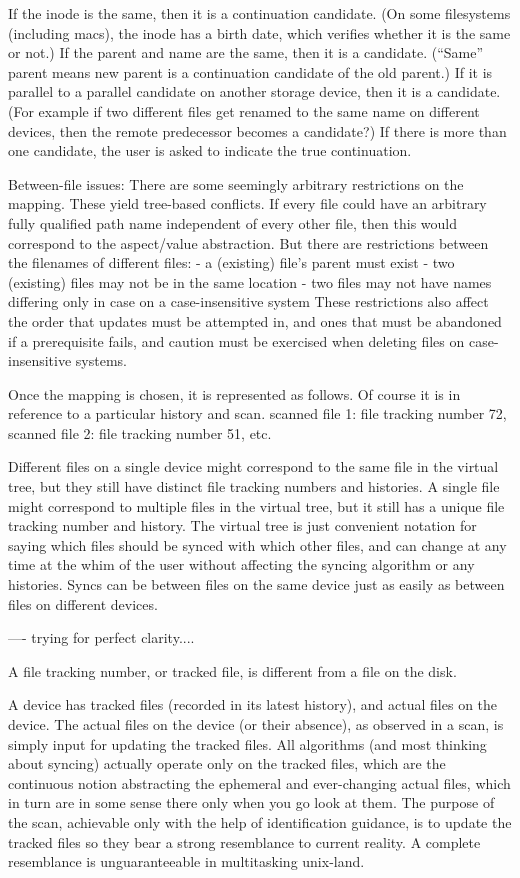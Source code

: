 \documentclass{book}
\begin{document}
If the inode is the same, then it is a continuation candidate.  (On some filesystems (including macs), the inode has a birth date, which verifies whether it is the same or not.)
If the parent and name are the same, then it is a candidate.  (``Same'' parent means new parent is a continuation candidate of the old parent.)
If it is parallel to a parallel candidate on another storage device, then it is a candidate.
(For example if two different files get renamed to the same name on different devices, then the remote predecessor becomes a candidate?)
If there is more than one candidate, the user is asked to indicate the true continuation.

Between-file issues:
There are some seemingly arbitrary restrictions on the mapping.  These yield tree-based conflicts.  If every file could have an arbitrary fully qualified path name independent of every other file, then this would correspond to the aspect/value abstraction.  But there are restrictions between the filenames of different files:
 - a (existing) file's parent must exist
 - two (existing) files may not be in the same location
 - two files may not have names differing only in case on a case-insensitive system
These restrictions also affect the order that updates must be attempted in, and ones that must be abandoned if a prerequisite fails, and caution must be exercised when deleting files on case-insensitive systems.

Once the mapping is chosen, it is represented as follows.  Of course it is in reference to a particular history and scan.
	scanned file 1: file tracking number 72, scanned file 2: file tracking number 51, etc.

Different files on a single device might correspond to the same file in the virtual tree, but they still have distinct file tracking numbers and histories.  A single file might correspond to multiple files in the virtual tree, but it still has a unique file tracking number and history.  The virtual tree is just convenient notation for saying which files should be synced with which other files, and can change at any time at the whim of the user without affecting the syncing algorithm or any histories.  Syncs can be between files on the same device just as easily as between files on different devices.

---- trying for perfect clarity....

A file tracking number, or tracked file, is different from a file on the disk.

A device has tracked files (recorded in its latest history), and actual files on the device.
The actual files on the device (or their absence), as observed in a scan, is simply input for updating the tracked files.
All algorithms (and most thinking about syncing) actually operate only on the tracked files, which are the continuous notion abstracting the ephemeral and ever-changing actual files, which in turn are in some sense there only when you go look at them.
The purpose of the scan, achievable only with the help of identification guidance, is to update the tracked files so they bear a strong resemblance to current reality.  A complete resemblance is unguaranteeable in multitasking unix-land.
\end{document}

